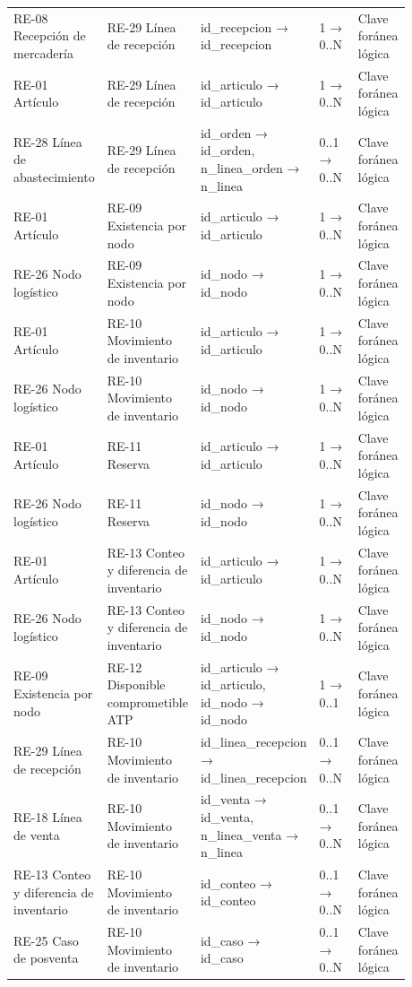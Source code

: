\documentclass[11pt]{article}
\begin{document}
\begin{longtable}{@{}p{0.215\linewidth}p{0.215\linewidth}p{0.224\linewidth}p{0.103\linewidth}p{0.120\linewidth}@{}}
RE-08 Recepción de mercadería & RE-29 Línea de recepción & id\_recepcion → id\_recepcion & 1 → 0..N & Clave foránea lógica \\
RE-01 Artículo & RE-29 Línea de recepción & id\_articulo → id\_articulo & 1 → 0..N & Clave foránea lógica \\
RE-28 Línea de abastecimiento & RE-29 Línea de recepción & id\_orden → id\_orden, n\_linea\_orden → n\_linea & 0..1 → 0..N & Clave foránea lógica \\
RE-01 Artículo & RE-09 Existencia por nodo & id\_articulo → id\_articulo & 1 → 0..N & Clave foránea lógica \\
RE-26 Nodo logístico & RE-09 Existencia por nodo & id\_nodo → id\_nodo & 1 → 0..N & Clave foránea lógica \\
RE-01 Artículo & RE-10 Movimiento de inventario & id\_articulo → id\_articulo & 1 → 0..N & Clave foránea lógica \\
RE-26 Nodo logístico & RE-10 Movimiento de inventario & id\_nodo → id\_nodo & 1 → 0..N & Clave foránea lógica \\
RE-01 Artículo & RE-11 Reserva & id\_articulo → id\_articulo & 1 → 0..N & Clave foránea lógica \\
RE-26 Nodo logístico & RE-11 Reserva & id\_nodo → id\_nodo & 1 → 0..N & Clave foránea lógica \\
RE-01 Artículo & RE-13 Conteo y diferencia de inventario & id\_articulo → id\_articulo & 1 → 0..N & Clave foránea lógica \\
RE-26 Nodo logístico & RE-13 Conteo y diferencia de inventario & id\_nodo → id\_nodo & 1 → 0..N & Clave foránea lógica \\
RE-09 Existencia por nodo & RE-12 Disponible comprometible ATP & id\_articulo → id\_articulo, id\_nodo → id\_nodo & 1 → 0..1 & Clave foránea lógica \\
RE-29 Línea de recepción & RE-10 Movimiento de inventario & id\_linea\_recepcion → id\_linea\_recepcion & 0..1 → 0..N & Clave foránea lógica \\
RE-18 Línea de venta & RE-10 Movimiento de inventario & id\_venta → id\_venta, n\_linea\_venta → n\_linea & 0..1 → 0..N & Clave foránea lógica \\
RE-13 Conteo y diferencia de inventario & RE-10 Movimiento de inventario & id\_conteo → id\_conteo & 0..1 → 0..N & Clave foránea lógica \\
RE-25 Caso de posventa & RE-10 Movimiento de inventario & id\_caso → id\_caso & 0..1 → 0..N & Clave foránea lógica \\

\end{longtable}
\end{document}
